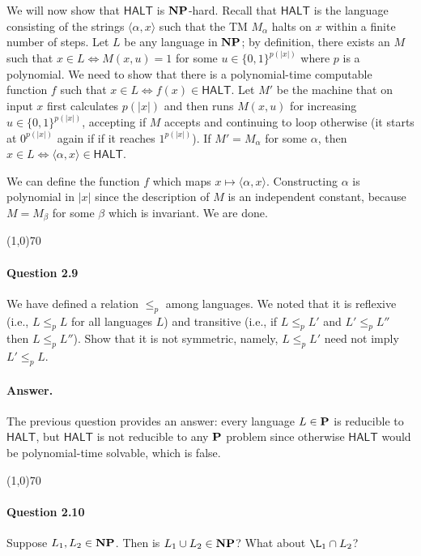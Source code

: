 We will now show that $\mathsf{HALT}$ is $\mathbf{NP}$-hard. Recall that $\mathsf{HALT}$ is the language consisting of the strings $\langle\alpha,x\rangle$ such that the TM $M_\alpha$ halts on $x$ within a finite number of steps. Let $L$ be any language in $\mathbf{NP}$; by definition, there exists an $M$ such that $x\in L\iff M(x,u)=1$ for some $u\in \{0,1\}^{p(|x|)}$ where $p$ is a polynomial. We need to show that there is a polynomial-time computable function $f$ such that $x\in L\iff f(x)\in\mathsf{HALT}$. Let $M'$ be the machine that on input $x$ first calculates $p(|x|)$ and then runs $M(x,u)$ for increasing $u\in \{0,1\}^{p(|x|)}$, accepting if $M$ accepts and continuing to loop otherwise (it starts at $0^{p(|x|)}$ again if if it reaches $1^{p(|x|)}$). If $M'=M_\alpha$ for some $\alpha$, then $x\in L\iff \langle\alpha,x\rangle\in\mathsf{HALT}$. 

We can define the function $f$ which maps $x\mapsto\langle\alpha,x\rangle$. Constructing $\alpha$ is polynomial in $|x|$ since the description of $M$ is an independent constant, because $M=M_\beta$ for some $\beta$ which is invariant. We are done.

\begin{center}
	\line(1,0){70}
\end{center}

\paragraph{Question 2.9} We have defined a relation $\leq_p$ among languages. We noted that it is reflexive (i.e., $L \leq_p L$ for all languages $L$) and transitive (i.e., if $L\leq_p L'$ and $L'\leq_p L''$ then $L\leq_p L''$). Show that it is not symmetric, namely, $L\leq_p L'$ need not imply $L'\leq_p L$.

\paragraph{Answer.} The previous question provides an answer: every language $L\in\mathbf{P}$ is reducible to $\mathsf{HALT}$, but $\mathsf{HALT}$ is not reducible to any $\mathbf{P}$ problem since otherwise $\mathsf{HALT}$ would be polynomial-time solvable, which is false.

\begin{center}
	\line(1,0){70}
\end{center}

\paragraph{Question 2.10} Suppose $L_1, L_2\in\mathbf{NP}$. Then is $L_1\cup L_2\in\mathbf{NP}$? What about $\L_1\cap L_2$?

